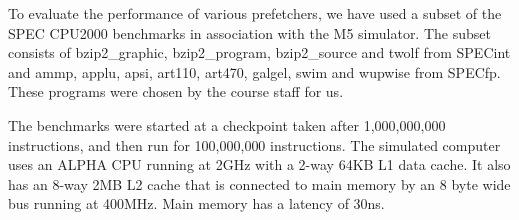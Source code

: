 To evaluate the performance of various prefetchers, we have used
a subset of the SPEC CPU2000 benchmarks in association with the M5
simulator. The subset consists of bzip2\_graphic, bzip2\_program, bzip2\_source and twolf from
SPECint and ammp, applu, apsi, art110, art470, galgel, swim and wupwise from SPECfp.
These programs were chosen by the course staff for us.

The benchmarks were started at a checkpoint taken after
1,000,000,000 instructions, and then run for 100,000,000 instructions.
The simulated computer uses an ALPHA CPU running at 2GHz
with a 2-way 64KB L1 data cache. It also has an 8-way 2MB L2 cache that is
connected to main memory by an 8 byte wide bus running at
400MHz. Main memory has a latency of 30ns.

